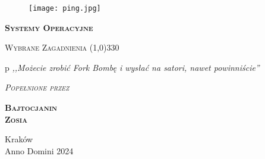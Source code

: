 \begin{titlepage} 
    \begin{center}
         \begin{figure}[h]
            \centering
           \texttt{[image: ping.jpg]}
        \end{figure}
        
        \Huge
        \textbf{\textsc{Systemy Operacyjne}}
        
        \vspace{0.5cm}
        \Large
        \textsc{Wybrane Zagadnienia}
        \line(1,0){330}
        
        \normalsize
        p
        \vspace{1cm}
        \textit{,,Możecie zrobić Fork Bombę i wysłać na satori, nawet powinniście''}
        \vspace{1cm}

        \textit{\textsc{Popełnione przez}}\\
        \vspace{5mm}
  
        \textbf{\textsc{Bajtocjanin \\ Zosia}}
 
        \vfill

        Kraków \\
        Anno Domini 2024
    \end{center}
\end{titlepage}